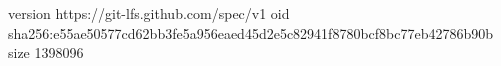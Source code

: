 version https://git-lfs.github.com/spec/v1
oid sha256:e55ae50577cd62bb3fe5a956eaed45d2e5c82941f8780bcf8bc77eb42786b90b
size 1398096
